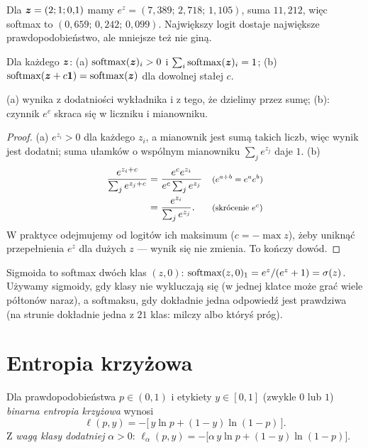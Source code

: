 \begin{przyklad}\label{prz:softmax}
Dla $\bm{z}=(2;1;0{,}1)$ mamy $e^{z}=(7{,}389;\,2{,}718;\,1{,}105)$, suma $11{,}212$, więc softmax to $(0{,}659;\,0{,}242;\,0{,}099)$.
Największy logit dostaje największe prawdopodobieństwo, ale mniejsze też nie giną.
\end{przyklad}

\begin{twierdzenie}\label{tw:softmax}
Dla każdego $\bm{z}$: (a) $\operatorname{softmax}(\bm{z})_i>0$ i $\sum_i\operatorname{softmax}(\bm{z})_i=1$; (b) $\operatorname{softmax}(\bm{z}+c\bm{1})=\operatorname{softmax}(\bm{z})$ dla dowolnej stałej $c$.
\end{twierdzenie}
\begin{pomyslDowodu}
(a) wynika z dodatniości wykładnika i z tego, że dzielimy przez sumę; (b): czynnik $e^c$ skraca się w liczniku i mianowniku.
\end{pomyslDowodu}
\begin{proof}
(a) $e^{z_i}>0$ dla każdego $z_i$, a mianownik jest sumą takich liczb, więc wynik jest dodatni; suma ułamków o wspólnym mianowniku $\sum_j e^{z_j}$ daje $1$.
(b)
\begin{align*}
\frac{e^{z_i+c}}{\sum_j e^{z_j+c}} &= \frac{e^{c}e^{z_i}}{e^{c}\sum_j e^{z_j}} && \text{\footnotesize ($e^{a+b}=e^ae^b$)}\\
 &= \frac{e^{z_i}}{\sum_j e^{z_j}}. && \text{\footnotesize (skrócenie $e^c$)}
\end{align*}
W praktyce odejmujemy od logitów ich maksimum ($c=-\max z$), żeby uniknąć przepełnienia $e^{z}$ dla dużych $z$ --- wynik się nie zmienia. To kończy dowód.
\end{proof}

Sigmoida to softmax dwóch klas $(z,0)$: $\operatorname{softmax}(z,0)_1=e^z/(e^z+1)=\sigma(z)$. Używamy sigmoidy, gdy klasy nie wykluczają się (w jednej klatce może grać wiele półtonów naraz), a softmaksu, gdy
dokładnie jedna odpowiedź jest prawdziwa (na strunie dokładnie jedna z $21$ klas: milczy albo któryś próg).

\section{Entropia krzyżowa}

\begin{definicja}\label{def:bce}
Dla prawdopodobieństwa $p\in(0,1)$ i etykiety $y\in[0,1]$ (zwykle $0$ lub $1$) \emph{binarna entropia krzyżowa} wynosi
\begin{equation}
  \ell(p,y)=-\big[\,y\ln p+(1-y)\ln(1-p)\,\big].
\end{equation}
Z \emph{wagą klasy dodatniej} $\alpha>0$: $\ell_\alpha(p,y)=-\big[\alpha\,y\ln p+(1-y)\ln(1-p)\big]$.
\end{definicja}

